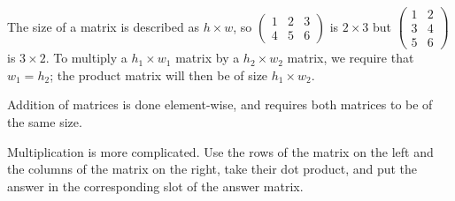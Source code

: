 \documentclass[../main.tex]{subfile}
\begin{document}



The size of a matrix is described as $h \times w$, so $\begin{pmatrix}1 & 2 & 3\\ 4 & 5 & 6\end{pmatrix}$ is $2 \times 3$ but $\begin{pmatrix}1 & 2\\ 3 & 4\\ 5 & 6\end{pmatrix}$ is $3 \times 2$. To multiply a $h_1 \times w_1$ matrix by a $h_2 \times w_2$ matrix, we require that $w_1 = h_2$; the product matrix will then be of size $h_1 \times w_2$.

Addition of matrices is done element-wise, and requires both matrices to be of the same size.

Multiplication is more complicated. Use the rows of the matrix on the left and the columns of the matrix on the right, take their dot product, and put the answer in the corresponding slot of the answer matrix.
\end{document}
